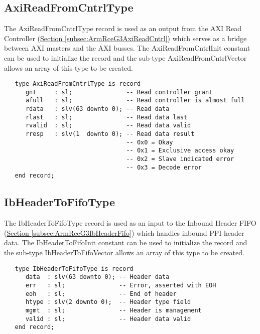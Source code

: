 \documentclass[11pt]{article}
\begin{document}
\subsection{AxiReadFromCntrlType}
\label{subsec:AxiReadFromCntrlType}

The AxiReadFromCntrlType record is used as an output from the AXI Read Controller (\hyperref[subsec:ArmRceG3AxiReadCntrl]{Section \ref*{subsec:ArmRceG3AxiReadCntrl}}) which serves as a bridge between AXI masters and the AXI busses.
The AxiReadFromCntrlInit constant can be used to initialize the record and the sub-type AxiReadFromCntrlVector allows an array of this type to be created.

\small
\begin{verbatim}
   type AxiReadFromCntrlType is record
      gnt     : sl;               -- Read controller grant
      afull   : sl;               -- Read controller is almost full
      rdata   : slv(63 downto 0); -- Read data
      rlast   : sl;               -- Read data last
      rvalid  : sl;               -- Read data valid
      rresp   : slv(1  downto 0); -- Read data result
                                  -- 0x0 = Okay
                                  -- 0x1 = Exclusive access okay
                                  -- 0x2 = Slave indicated error 
                                  -- 0x3 = Decode error
   end record;
\end{verbatim}
\normalsize

\subsection{IbHeaderToFifoType}
\label{subsec:IbHeaderToFifoType}

The IbHeaderToFifoType record is used as an input to the Inbound Header FIFO (\hyperref[subsec:ArmRceG3IbHeaderFifo]{Section \ref*{subsec:ArmRceG3IbHeaderFifo}}) which handles inbound PPI header data. 
The IbHeaderToFifoInit constant can be used to initialize the record and the sub-type IbHeaderToFifoVector allows an array of this type to be created.

\small
\begin{verbatim}
   type IbHeaderToFifoType is record
      data  : slv(63 downto 0); -- Header data
      err   : sl;               -- Error, asserted with EOH
      eoh   : sl;               -- End of header
      htype : slv(2 downto 0);  -- Header type field
      mgmt  : sl;               -- Header is management
      valid : sl;               -- Header data valid
   end record;
\end{verbatim}
\normalsize
\end{document}
